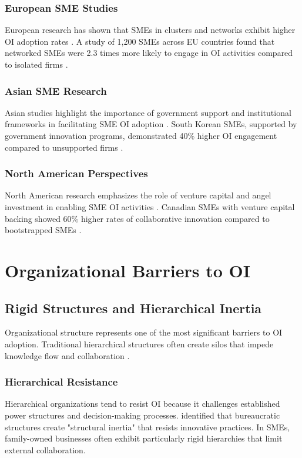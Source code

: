 \subsubsection{European SME Studies}
European research has shown that SMEs in clusters and networks exhibit higher OI adoption rates \citep{muller2005open}. A study of 1,200 SMEs across EU countries found that networked SMEs were 2.3 times more likely to engage in OI activities compared to isolated firms \citep{hoffmann2009small}.

\subsubsection{Asian SME Research}
Asian studies highlight the importance of government support and institutional frameworks in facilitating SME OI adoption \citep{lee2010open}. South Korean SMEs, supported by government innovation programs, demonstrated 40\% higher OI engagement compared to unsupported firms \citep{kim2012government}.

\subsubsection{North American Perspectives}
North American research emphasizes the role of venture capital and angel investment in enabling SME OI activities \citep{chris2009open}. Canadian SMEs with venture capital backing showed 60\% higher rates of collaborative innovation compared to bootstrapped SMEs \citep{fisher2013venture}.

\section{Organizational Barriers to OI}

\subsection{Rigid Structures and Hierarchical Inertia}

Organizational structure represents one of the most significant barriers to OI adoption. Traditional hierarchical structures often create silos that impede knowledge flow and collaboration \citep{morgan2006characteristics}.

\subsubsection{Hierarchical Resistance}
Hierarchical organizations tend to resist OI because it challenges established power structures and decision-making processes. \cite{burns1961management} identified that bureaucratic structures create "structural inertia" that resists innovative practices. In SMEs, family-owned businesses often exhibit particularly rigid hierarchies that limit external collaboration.

